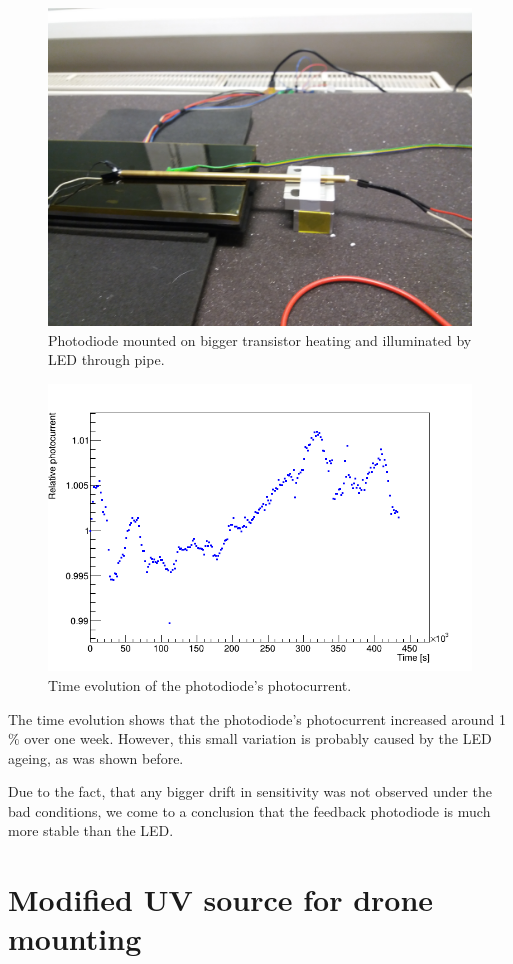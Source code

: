 \begin{figure}[H]
 \centering
 \includegraphics[scale=0.08, angle=180]{./pictures/TempDestrc}
 \caption{Photodiode mounted on bigger transistor heating and illuminated by LED through pipe.}
 \label{aging}
\end{figure}


\begin{figure}[H]
 \centering
 \includegraphics[scale=0.5]{./pictures/ArtiAging}
 \caption{Time evolution of the photodiode's photocurrent.}
 \label{agingPhotoCurrent}
\end{figure}

The time evolution shows that the photodiode's photocurrent increased around 1 $\%$ over one week. However, this small variation is probably caused by the LED ageing, as was shown before. 
\par
Due to the fact, that any bigger drift in sensitivity was not observed under the bad conditions, we come to a conclusion that the feedback photodiode is much more stable than the LED.



\section{Modified UV source for drone mounting}



